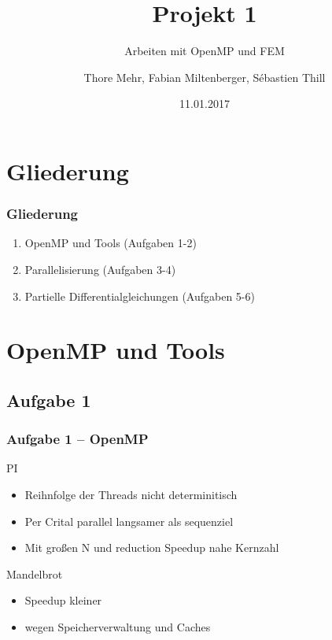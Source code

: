 \documentclass[german,notes,18pt]{beamer}
\title{Projekt 1}
\subtitle{Arbeiten mit OpenMP und FEM}
\author{Thore Mehr, Fabian Miltenberger, Sébastien Thill}
\date{11.01.2017}
\institute{Lehrstuhl für Rechnerarchitektur und Parallelverarbeitung (ITEC)}
\begin{document}
	
	\frame{\titlepage}
	
	\section{Gliederung}
	\begin{frame}
		\frametitle{Gliederung}
		
		\begin{enumerate}
			\item OpenMP und Tools (Aufgaben 1-2)
			\item Parallelisierung (Aufgaben 3-4)
			\item Partielle Differentialgleichungen (Aufgaben 5-6)
		\end{enumerate}
	\end{frame}

	\section{OpenMP und Tools}
	\subsection{Aufgabe 1}
	\begin{frame}
		\frametitle{Aufgabe 1 -- OpenMP}
		PI\\
		\begin{itemize}
			\item Reihnfolge der Threads nicht determinitisch
			\item Per Crital parallel langsamer als sequenziel
			\item Mit großen N und reduction Speedup nahe Kernzahl
		\end{itemize}
		Mandelbrot\\
		\begin{itemize}
			\item Speedup kleiner
			\item wegen Speicherverwaltung und Caches
		\end{itemize}
	\end{frame}
\end{document}
